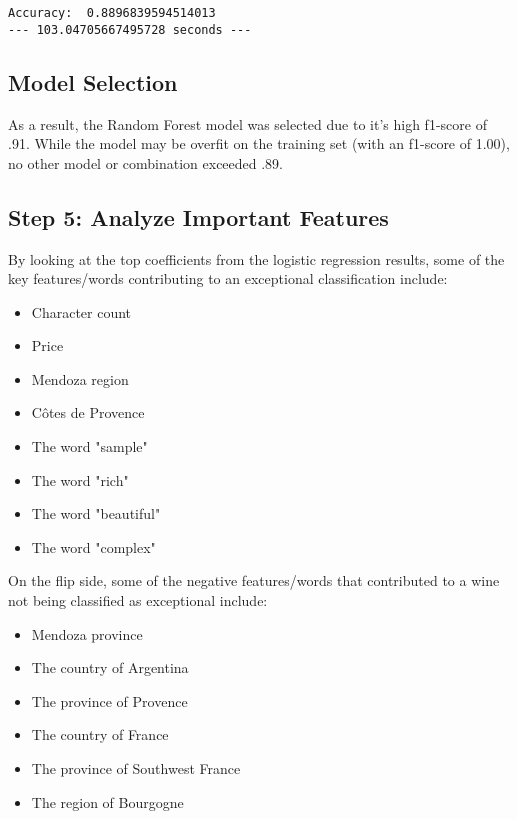 \documentclass[11pt]{article}
\providecommand{\tightlist}{%
      \setlength{\itemsep}{0pt}\setlength{\parskip}{0pt}}
\begin{document}
    \begin{Verbatim}[commandchars=\\\{\}]
Accuracy:  0.8896839594514013
--- 103.04705667495728 seconds ---

    \end{Verbatim}

    \subsection{Model Selection}\label{model-selection}

As a result, the Random Forest model was selected due to it's high
f1-score of .91. While the model may be overfit on the training set
(with an f1-score of 1.00), no other model or combination exceeded .89.

    \subsection{Step 5: Analyze Important
Features}\label{step-5-analyze-important-features}

By looking at the top coefficients from the logistic regression results,
some of the key features/words contributing to an exceptional
classification include:

\begin{itemize}
\tightlist
\item
  Character count
\item
  Price
\item
  Mendoza region
\item
  Côtes de Provence
\item
  The word "sample"
\item
  The word "rich"
\item
  The word "beautiful"
\item
  The word "complex"
\end{itemize}

On the flip side, some of the negative features/words that contributed
to a wine not being classified as exceptional include:

\begin{itemize}
\tightlist
\item
  Mendoza province
\item
  The country of Argentina
\item
  The province of Provence
\item
  The country of France
\item
  The province of Southwest France
\item
  The region of Bourgogne
\end{itemize}
\end{document}
